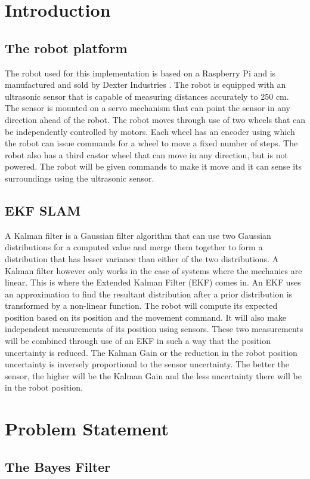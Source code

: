 \documentclass[conference]{IEEEtran}
\begin{document}
\section{Introduction}
\subsection{The robot platform}
The robot used for this implementation is based on a Raspberry Pi and is manufactured and sold by Dexter Industries \cite{dexter}. The robot is equipped with an ultrasonic sensor that is capable of measuring distances accurately to 250 cm. The sensor is mounted on a servo mechanism that can point the sensor in any direction ahead of the robot. The robot moves through use of two wheels that can be independently controlled by motors. Each wheel has an encoder using which the robot can issue commands for a wheel to move a fixed number of steps. The robot also has a third castor wheel that can move in any direction, but is not powered. The robot will be given commands to make it move and it can sense its surroundings using the ultrasonic sensor.
\subsection{EKF SLAM}
A Kalman filter is a Gaussian filter algorithm that can use two Gaussian distributions for a computed value and merge them together to form a distribution that has lesser variance than either of the two distributions. A Kalman filter however only works in the case of systems where the mechanics are linear. This is where the Extended Kalman Filter (EKF) comes in. An EKF uses an approximation to find the resultant distribution after a prior distribution is transformed by a non-linear function.
The robot will compute its expected position based on its position and the movement command. It will also make independent measurements of its position using sensors. These two measurements will be combined through use of an EKF in such a way that the position uncertainty is reduced. The Kalman Gain or the reduction in the robot position uncertainty is inversely proportional to the sensor uncertainty. The better the sensor, the higher will be the Kalman Gain and the less uncertainty there will be in the robot position\cite{stachniss}.

\section{Problem Statement}
\subsection{The Bayes Filter}
\end{document}
